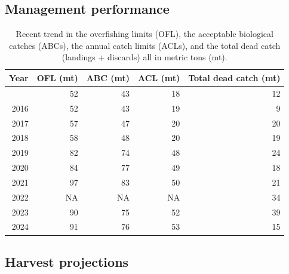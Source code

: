 \documentclass[
]{scrartcl}
\begin{document}
\endgroup

\clearpage

\subsection*{Management performance}\label{management-performance}

\begingroup
\fontsize{9.0pt}{10.8pt}\selectfont

\begin{longtable}{rrrrr}

\caption{\label{tbl-es-management}Recent trend in the overfishing limits
(OFL), the acceptable biological catches (ABCs), the annual catch limits
(ACLs), and the total dead catch (landings + discards) all in metric
tons (mt).}

\tabularnewline

\toprule
Year & OFL (mt) & ABC (mt) & ACL (mt) & Total dead catch (mt) \\ 
\midrule\addlinespace[2.5pt]
2015 & 52 & 43 & 18 & 12 \\ 
2016 & 52 & 43 & 19 & 9 \\ 
2017 & 57 & 47 & 20 & 20 \\ 
2018 & 58 & 48 & 20 & 19 \\ 
2019 & 82 & 74 & 48 & 24 \\ 
2020 & 84 & 77 & 49 & 18 \\ 
2021 & 97 & 83 & 50 & 21 \\ 
2022 & NA & NA & NA & 34 \\ 
2023 & 90 & 75 & 52 & 39 \\ 
2024 & 91 & 76 & 53 & 15 \\ 
\bottomrule

\end{longtable}

\endgroup

\subsection*{Harvest projections}\label{harvest-projections}

\begingroup
\fontsize{9.0pt}{10.8pt}\selectfont
\end{document}
